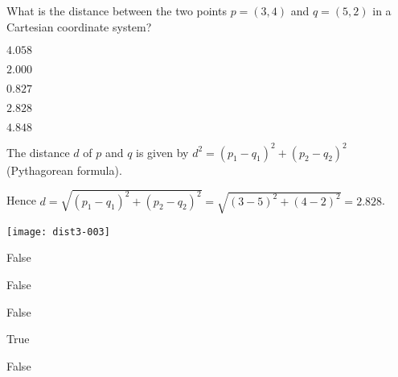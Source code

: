 
\begin{question}
What is the distance between the two points
$p = (3, 4)$ and $q = (5, 2)$
in a Cartesian coordinate system?

\begin{answerlist}
  \item $4.058$
  \item $2.000$
  \item $0.827$
  \item $2.828$
  \item $4.848$
\end{answerlist}\end{question}

\begin{solution}
The distance $d$ of $p$ and $q$ is given by
$d^2 = (p_1 - q_1)^2 + (p_2 - q_2)^2$ (Pythagorean formula).

Hence $d = \sqrt{(p_1 - q_1)^2 + (p_2 - q_2)^2} =
  \sqrt{(3 - 5)^2 + (4 - 2)^2}
   = 2.828$.

\texttt{[image: dist3-003]}

\begin{answerlist}
  \item False
  \item False
  \item False
  \item True
  \item False
\end{answerlist}\end{solution}

